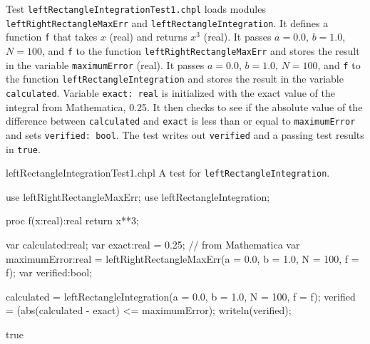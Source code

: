   \begin{enumspec}
  \item{}
    Test \lstinline{leftRectangleIntegrationTest1.chpl} loads modules
    \lstinline{leftRightRectangleMaxErr} and
    \lstinline{leftRectangleIntegration}.
    It defines a function \lstinline{f} that takes $x$ (real) and returns $x^3$ (real).
    It passes $a=0.0$, $b=1.0$, $N=100$, and \lstinline{f} to the function
    \lstinline{leftRightRectangleMaxErr} and stores the result in the variable
    \lstinline{maximumError} (real).
    It passes $a=0.0$, $b=1.0$, $N=100$, and \lstinline{f} to the function
    \lstinline{leftRectangleIntegration} and stores the result in the variable
    \lstinline{calculated}.
    Variable \lstinline{exact: real} is initialized with the exact value of the integral from
    Mathematica, 0.25.
    It then checks to see if the absolute value of the difference between \lstinline{calculated} 
    and \lstinline{exact} is less than or equal to \lstinline{maximumError} and sets 
    \lstinline{verified: bool}. The test writes out \lstinline{verified} and a passing
    test results in \lstinline{true}.
  \end{enumspec}

  \begin{chapelexample}{leftRectangleIntegrationTest1.chpl}
    A test for \lstinline{leftRectangleIntegration}.
    \begin{chapelpre}
    \end{chapelpre}
    \begin{chapel}
      use leftRightRectangleMaxErr;
      use leftRectangleIntegration;

      proc f(x:real):real {
        return x**3;
      } 

      var calculated:real;
      var exact:real = 0.25;  // from Mathematica
      var maximumError:real = leftRightRectangleMaxErr(a = 0.0, b = 1.0, N = 100, f = f);
      var verified:bool;

      calculated = leftRectangleIntegration(a = 0.0, b = 1.0, N = 100, f = f);
      verified = (abs(calculated - exact) <= maximumError);
      writeln(verified);
    \end{chapel}
    \begin{chapelpost}
    \end{chapelpost}
    \begin{chapeloutput}
true
    \end{chapeloutput}
  \end{chapelexample}

